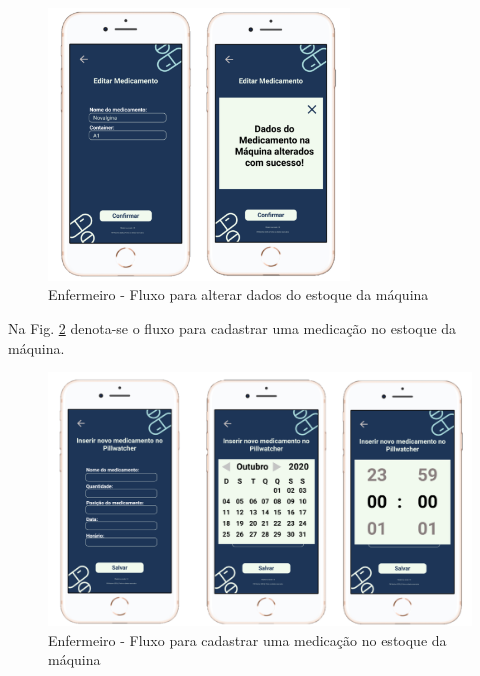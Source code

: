 \begin{figure}[H]
    \centering
      \includegraphics[width=8cm]{figuras/software/Atual_prototipo/Enfermeiro_gerenciarEstoqueMaquina_3.png}
    \caption{Enfermeiro - Fluxo para alterar dados do estoque da máquina}
    \label{fig:prototipo_enfermeiro_gerenciarEstoqueMaquina_3}
\end{figure}

Na Fig. \ref{fig:prototipo_enfermeiro_gerenciarEstoqueMaquina_4} denota-se o fluxo para cadastrar uma medicação no estoque da máquina.

\begin{figure}[H]
    \centering
      \includegraphics[width=15cm]{figuras/software/Atual_prototipo/Enfermeiro_gerenciarEstoqueMaquina_4.png}
    \caption{Enfermeiro - Fluxo para cadastrar uma medicação no estoque da máquina}
    \label{fig:prototipo_enfermeiro_gerenciarEstoqueMaquina_4}
\end{figure}

